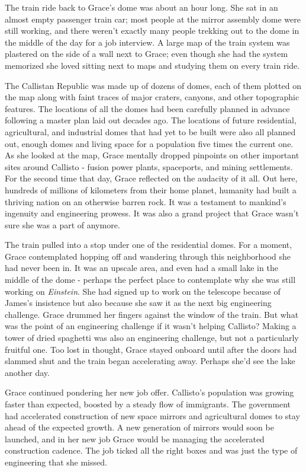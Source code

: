 \documentclass[openany, 12pt]{book} %
\begin{document}
The train ride back to Grace's dome was about an hour long. She sat in an almost empty passenger train car; most people at the mirror assembly dome were still working, and there weren't exactly many people trekking out to the dome in the middle of the day for a job interview. A large map of the train system was plastered on the side of a wall next to Grace; even though she had the system memorized she loved sitting next to maps and studying them on every train ride. 

The Callistan Republic was made up of dozens of domes, each of them plotted on the map along with faint traces of major craters, canyons, and other topographic features. The locations of all the domes had been carefully planned in advance following a master plan laid out decades ago. The locations of future residential, agricultural, and industrial domes that had yet to be built were also all planned out, enough domes and living space for a population five times the current one. As she looked at the map, Grace mentally dropped pinpoints on other important sites around Callisto - fusion power plants, spaceports, and mining settlements. For the second time that day, Grace reflected on the audacity of it all. Out here, hundreds of millions of kilometers from their home planet, humanity had built a thriving nation on an otherwise barren rock. It was a testament to mankind's ingenuity and engineering prowess. It was also a grand project that Grace wasn't sure she was a part of anymore.

The train pulled into a stop under one of the residential domes. For a moment, Grace contemplated hopping off and wandering through this neighborhood she had never been in. It was an upscale area, and even had a small lake in the middle of the dome - perhaps the perfect place to contemplate why she was still working on \textit{Einstein}. She had signed up to work on the telescope because of James's insistence but also because she saw it as the next big engineering challenge. Grace drummed her fingers against the window of the train. But what was the point of an engineering challenge if it wasn't helping Callisto? Making a tower of dried spaghetti was also an engineering challenge, but not a particularly fruitful one. Too lost in thought, Grace stayed onboard until after the doors had slammed shut and the train began accelerating away. Perhaps she'd see the lake another day.

Grace continued pondering her new job offer. Callisto's population was growing faster than expected, boosted by a steady flow of immigrants. The government had accelerated construction of new space mirrors and agricultural domes to stay ahead of the expected growth. A new generation of mirrors would soon be launched, and in her new job Grace would be managing the accelerated construction cadence. The job ticked all the right boxes and was just the type of engineering that she missed.
\end{document}
